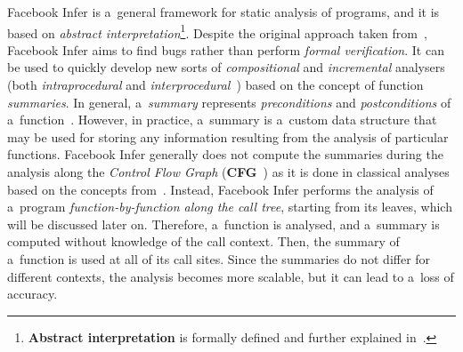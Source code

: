 \documentclass{ExcelAtFIT}
\theoremstyle{definition}
\begin{document}
Facebook Infer is a~general framework for static analysis of programs, and it is based on \emph{abstract interpretation}\footnote{\textbf{Abstract interpretation} is formally defined and further explained in~\cite{AILatticeModelCousot, wideningNarrowingCousot, staticAnalysisMoller, programAnalysisNielson, staticAnalysisRival}.}. Despite the original approach taken from~\cite{inferBiabduction}, Facebook Infer aims to find bugs rather than perform \emph{formal verification}. It can be used to quickly develop new sorts of \emph{compositional} and \emph{incremental} analysers (both \emph{intraprocedural} and \emph{interprocedural}~\cite{programAnalysisNielson}) based on the concept of function \emph{summaries}. In general, a~\emph{summary} represents \emph{preconditions} and \emph{postconditions} of a~function~\cite{hoare}. However, in practice, a~summary is a~custom data structure that may be used for storing any information resulting from the analysis of particular functions. Facebook Infer generally does not compute the summaries during the analysis along the \emph{Control Flow Graph} (\textbf{CFG}~\cite{controlFlowAnalysisAllen}) as it is done in classical analyses based on the concepts from~\cite{DFAGraphReach, DFAApproaches}. Instead, Facebook Infer performs the analysis of a~program \emph{function-by-function along the call tree}, starting from its leaves, which will be discussed later on. Therefore, a~function is analysed, and a~summary is computed without knowledge of the call context. Then, the summary of a~function is used at all of its call sites. Since the summaries do not differ for different contexts, the analysis becomes more scalable, but it can lead to a~loss of accuracy.
\end{document}
